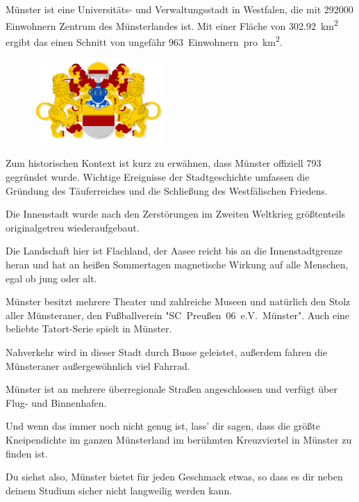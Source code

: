\begin{multicols}{2}
Münster ist eine Universitäts- und Verwaltungsstadt in Westfalen, die mit \num{292000} Einwohnern Zentrum des Münsterlandes ist. Mit einer Fläche von \SI{302,92}{\km\squared} ergibt das einen Schnitt von ungefähr \SI{963}{Einwohnern pro \km\squared}.

\setlength{\intextsep}{0cm}
\setlength{\columnsep}{0.2cm}
\begin{figure}
\centering
\includegraphics[width=5cm]{res/muenster_stadt_wappen.pdf}
\end{figure}
Zum historischen Kontext ist kurz zu erwähnen, dass Münster offiziell 793 gegründet wurde. Wichtige Ereignisse der Stadtgeschichte umfassen die Gründung des Täuferreiches und die Schließung des Westfälischen Friedens.

Die Innenstadt wurde nach den Zerstörungen im Zweiten Weltkrieg größtenteils originalgetreu wiederaufgebaut.

Die Landschaft hier ist Flachland, der Aasee reicht bis an die Innenstadtgrenze heran und hat an heißen Sommertagen magnetische Wirkung auf alle Menschen, egal ob jung oder alt.

Münster besitzt mehrere Theater und zahlreiche  Museen und natürlich den Stolz aller Münsteraner, den Fußballverein "SC~Preußen~06~e.V.~Münster". Auch eine beliebte Tatort-Serie spielt in Münster.

Nahverkehr wird in dieser Stadt durch Busse geleistet, außerdem fahren die Münsteraner außergewöhnlich viel Fahrrad.

Münster ist an mehrere überregionale Straßen angeschlossen und verfügt über Flug- und Binnenhafen.

\setlength{\columnsep}{0.2cm}
\begin{figure}
	\centering
\end{figure}
Und wenn das immer noch nicht genug ist, lass' dir sagen, dass die größte Kneipendichte im ganzen Münsterland im berühmten Kreuzviertel in Münster zu finden ist.

Du siehst also, Münster bietet für jeden Geschmack etwas, so dass es dir neben deinem Studium sicher nicht langweilig werden kann.

\begin{center}
\large{}
\end{center}

\end{multicols}
